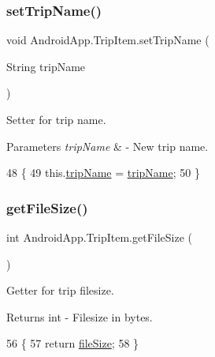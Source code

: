 \subsubsection{\texorpdfstring{set\+Trip\+Name()}{setTripName()}}
{\footnotesize\ttfamily void Android\+App.\+Trip\+Item.\+set\+Trip\+Name (\begin{DoxyParamCaption}\item[{String}]{trip\+Name }\end{DoxyParamCaption})\hspace{0.3cm}{\ttfamily [inline]}}



Setter for trip name. 


\begin{DoxyParams}{Parameters}
{\em trip\+Name} & -\/ New trip name. \\
\hline
\end{DoxyParams}

\begin{DoxyCode}
48                                              \{
49         this.\hyperlink{class_android_app_1_1_trip_item_ae5137b0b6077e3fcf293430bc9c488e3}{tripName} = \hyperlink{class_android_app_1_1_trip_item_ae5137b0b6077e3fcf293430bc9c488e3}{tripName};
50     \}
\end{DoxyCode}
\mbox{\label{class_android_app_1_1_trip_item_a565ec50649fe1edf5db7301ec3f10497}} 
\subsubsection{\texorpdfstring{get\+File\+Size()}{getFileSize()}}
{\footnotesize\ttfamily int Android\+App.\+Trip\+Item.\+get\+File\+Size (\begin{DoxyParamCaption}{ }\end{DoxyParamCaption})\hspace{0.3cm}{\ttfamily [inline]}}



Getter for trip filesize. 

\begin{DoxyReturn}{Returns}
int -\/ Filesize in bytes. 
\end{DoxyReturn}

\begin{DoxyCode}
56                              \{
57         \textcolor{keywordflow}{return} \hyperlink{class_android_app_1_1_trip_item_a0689a1340427784d8658cc616da310f2}{fileSize};
58     \}
\end{DoxyCode}
\mbox{\label{class_android_app_1_1_trip_item_a85d328bdc6fd3d54c5c275aea2e23852}} 
